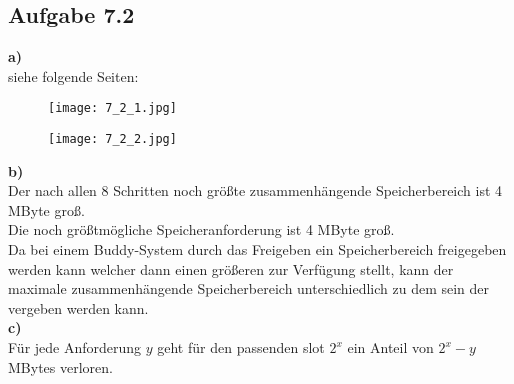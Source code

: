\documentclass[a4paper,graphics,11pt]{article}
\newcommand{\aufgabe}[1]{\subsection*{Aufgabe #1}}
\begin{document}
\aufgabe{7.2}
\textbf{a)}\\
siehe folgende Seiten:
\begin{figure}[ht]
    \centering
    	\texttt{[image: 7\_2\_1.jpg]}
\end{figure}
\begin{figure}[ht]
    \centering
    	\texttt{[image: 7\_2\_2.jpg]}
\end{figure}
\newline
\newline
\textbf{b)}\\
Der nach allen 8 Schritten noch größte zusammenhängende Speicherbereich ist 4 MByte groß.\\
\newline
Die noch größtmögliche Speicheranforderung ist 4 MByte groß.\\
\newline
Da bei einem Buddy-System durch das Freigeben ein Speicherbereich freigegeben werden kann welcher dann einen größeren zur Verfügung stellt, kann der maximale zusammenhängende Speicherbereich unterschiedlich zu dem sein der vergeben werden kann.\\
\newline
\textbf{c)}\\
Für jede Anforderung $y$ geht für den passenden slot  $2^x$ ein Anteil von $2^x-y$ MBytes verloren.
\end{document}
